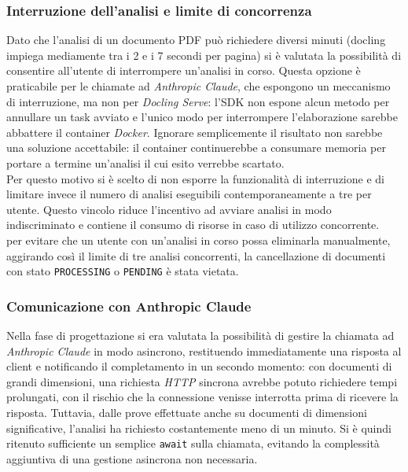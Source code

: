 \subsubsection[Interruzione analisi]{Interruzione dell'analisi e limite di concorrenza}
\label{subsection:interruzione_analisi}
Dato che l'analisi di un documento PDF può richiedere diversi minuti (\gls{docling} impiega mediamente tra i 2 e i 7 secondi per pagina) si è valutata la possibilità di consentire all'utente di interrompere un'analisi in corso. Questa opzione è praticabile per le chiamate ad \emph{Anthropic Claude}, che espongono un meccanismo di interruzione, ma non per \emph{Docling Serve}: l'SDK non espone alcun metodo per annullare un task avviato e l'unico modo per interrompere l'elaborazione sarebbe abbattere il container \emph{Docker}. Ignorare semplicemente il risultato non sarebbe una soluzione accettabile: il container continuerebbe a consumare memoria per portare a termine un'analisi il cui esito verrebbe scartato.\\

Per questo motivo si è scelto di non esporre la funzionalità di interruzione e di limitare invece il numero di analisi eseguibili contemporaneamente a tre per utente. Questo vincolo riduce l'incentivo ad avviare analisi in modo indiscriminato e contiene il consumo di risorse in caso di utilizzo concorrente. \\

per evitare che un utente con un'analisi in corso possa eliminarla manualmente, aggirando così il limite di tre analisi concorrenti, la cancellazione di documenti con stato \texttt{PROCESSING} o \texttt{PENDING} è stata vietata.

\subsubsection{Comunicazione con Anthropic Claude}
Nella fase di progettazione si era valutata la possibilità di gestire la chiamata ad \emph{Anthropic Claude} in modo asincrono, restituendo immediatamente una risposta al client e notificando il completamento in un secondo momento: con documenti di grandi dimensioni, una richiesta \emph{HTTP} sincrona avrebbe potuto richiedere tempi prolungati, con il rischio che la connessione venisse interrotta prima di ricevere la risposta. Tuttavia, dalle prove effettuate anche su documenti di dimensioni significative, l'analisi ha richiesto costantemente meno di un minuto. Si è quindi ritenuto sufficiente un semplice \texttt{await} sulla chiamata, evitando la complessità aggiuntiva di una gestione asincrona non necessaria.

